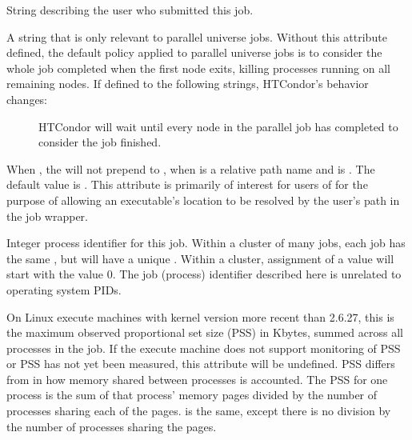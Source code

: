 \begin{description}
\item[\AdAttr{Owner}:]  String describing the user who submitted this
job.

\item[\AdAttr{ParallelShutdownPolicy}:]  A string that is only relevant
to parallel universe jobs.  Without this attribute defined, the default
policy applied to parallel universe jobs is to consider the whole job
completed when the first node exits, killing processes running on
all remaining nodes.  If defined to the following strings, HTCondor's
behavior changes:
  \begin{description}
  \item[] HTCondor will wait until every node in 
  the parallel job has completed to consider the job finished.
  \end{description}

\item[\AdAttr{PreserveRelativeExecutable}:]  When , 
the  will not prepend 
to , when  is a relative path name
and  is .  
The default value is .
This attribute is primarily of interest for users of 
for the purpose of allowing an executable's location to be resolved 
by the user's path in the job wrapper.

\item[\AdAttr{ProcId}:]  Integer process identifier for this job.
Within a cluster of many jobs,
each job has the same , but will have a unique .
Within a cluster, assignment of a  value will start
with the value 0.
The job (process) identifier described here is unrelated to operating
system PIDs.

\item[\AdAttr{ProportionalSetSizeKb}:]
On Linux execute machines with kernel version more recent than 2.6.27,
this is the maximum observed proportional set size (PSS) in Kbytes,
summed across all processes in the job.
If the execute machine does not
support monitoring of PSS or PSS has not yet been measured,
this attribute will be undefined.  
PSS differs from  in how memory shared
between processes is accounted.
The PSS for one process is the sum of that process' memory pages 
divided by the number of processes sharing each of the pages.
 is the same,
except there is no division by the number of processes sharing the pages.


\end{description}
